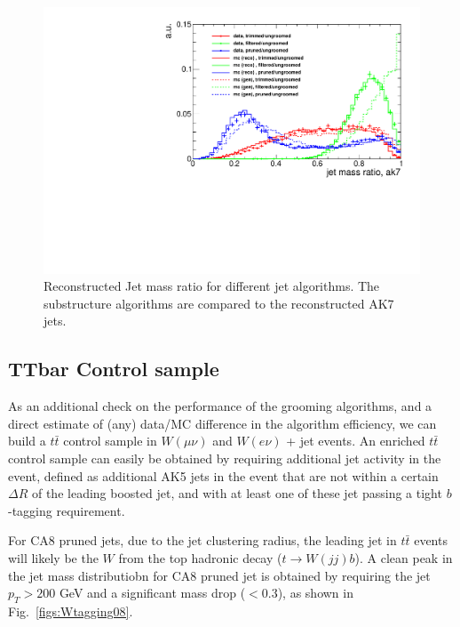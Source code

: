 \begin{figure}[!htb]
\centering
\includegraphics[width=1.0\textwidth]{figs/jetmass_1Dratio_ak7.pdf}
\caption{Reconstructed Jet mass ratio for different jet algorithms. The substructure algorithms are compared to the
  reconstructed AK7 jets.}
\label{figs:1dJetMassRatio}
\end{figure}


\subsection{TTbar Control sample}

As an additional check on the performance of the grooming algorithms, and a direct estimate of (any) data/MC difference in the algorithm efficiency, we can build a $t\bar{t}$ control sample in $W(\mu\nu)$ and $W(e\nu)$ + jet events. An enriched $t\bar{t}$ control sample can easily be obtained by requiring additional jet activity in the event, defined as additional AK5 jets  in the event that are not within a certain $\Delta R$ of the leading boosted jet, and with at least one of these jet passing a tight $b$-tagging requirement.

For CA8 pruned jets, due to the jet clustering radius, the leading jet in $t\bar{t}$ events will likely be the $W$ from the top hadronic decay ($t \to W(jj)b$). A clean peak in the jet mass distributiobn for CA8 pruned jet is obtained by requiring the jet $p_T >200$ GeV and a significant mass drop ($<0.3$), as shown in Fig.~\ref{figs:Wtagging08}.

